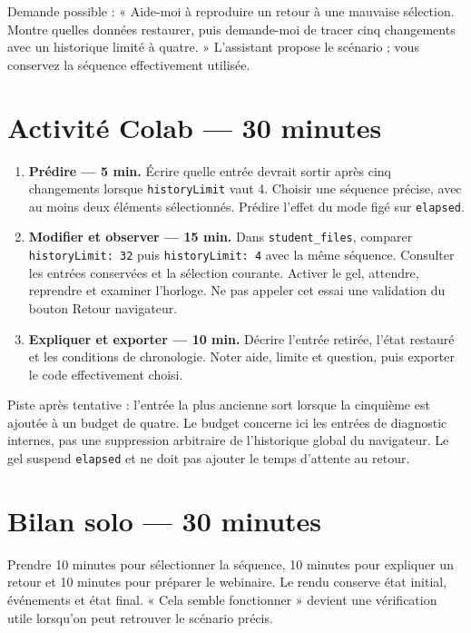 \documentclass[
  canadien,
  11pt,
  a4paper,
]{report}
\providecommand{\tightlist}{%
  \setlength{\itemsep}{0pt}\setlength{\parskip}{0pt}}
\begin{document}
Demande possible : « Aide-moi à reproduire un retour à une mauvaise
sélection. Montre quelles données restaurer, puis demande-moi de tracer
cinq changements avec un historique limité à quatre. » L'assistant
propose le scénario ; vous conservez la séquence effectivement utilisée.

\section{Activité Colab --- 30
minutes}\label{activituxe9-colab-30-minutes-6}

\begin{enumerate}
\def\labelenumi{\arabic{enumi}.}
\tightlist
\item
  \textbf{Prédire --- 5 min.} Écrire quelle entrée devrait sortir après
  cinq changements lorsque \texttt{history\allowbreak{}Limit} vaut 4. Choisir une
  séquence précise, avec au moins deux éléments sélectionnés. Prédire
  l'effet du mode figé sur \texttt{elapsed}.
\item
  \textbf{Modifier et observer --- 15 min.} Dans
  \texttt{student\_\allowbreak{}files}, comparer \texttt{history\allowbreak{}Limit:\ 32} puis
  \texttt{history\allowbreak{}Limit:\ 4} avec la même séquence. Consulter les entrées
  conservées et la sélection courante. Activer le gel, attendre,
  reprendre et examiner l'horloge. Ne pas appeler cet essai une
  validation du bouton Retour navigateur.
\item
  \textbf{Expliquer et exporter --- 10 min.} Décrire l'entrée retirée,
  l'état restauré et les conditions de chronologie. Noter aide, limite
  et question, puis exporter le code effectivement choisi.
\end{enumerate}

Piste après tentative : l'entrée la plus ancienne sort lorsque la
cinquième est ajoutée à un budget de quatre. Le budget concerne ici les
entrées de diagnostic internes, pas une suppression arbitraire de
l'historique global du navigateur. Le gel suspend \texttt{elapsed} et ne
doit pas ajouter le temps d'attente au retour.

\section{Bilan solo --- 30 minutes}\label{bilan-solo-30-minutes-6}

Prendre 10 minutes pour sélectionner la séquence, 10 minutes pour
expliquer un retour et 10 minutes pour préparer le webinaire. Le rendu
conserve état initial, événements et état final. « Cela semble
fonctionner » devient une vérification utile lorsqu'on peut retrouver le
scénario précis.
\end{document}
